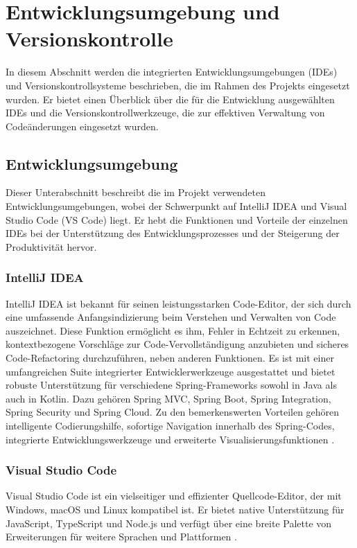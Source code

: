 \section{Entwicklungsumgebung und Versionskontrolle}
In diesem Abschnitt werden die integrierten Entwicklungsumgebungen (IDEs) und Versionskontrollsysteme beschrieben, die im Rahmen des Projekts eingesetzt wurden. Er bietet einen Überblick über die für die Entwicklung ausgewählten IDEs und die Versionskontrollwerkzeuge, die zur effektiven Verwaltung von Codeänderungen eingesetzt wurden.
\subsection{Entwicklungsumgebung}
Dieser Unterabschnitt beschreibt die im Projekt verwendeten Entwicklungsumgebungen, wobei der Schwerpunkt auf IntelliJ IDEA und Visual Studio Code (VS Code) liegt. Er hebt die Funktionen und Vorteile der einzelnen IDEs bei der Unterstützung des Entwicklungsprozesses und der Steigerung der Produktivität hervor.

\subsubsection{IntelliJ IDEA}

IntelliJ IDEA ist bekannt für seinen leistungsstarken Code-Editor, der sich durch eine umfassende Anfangsindizierung beim Verstehen und Verwalten von Code auszeichnet. Diese Funktion ermöglicht es ihm, Fehler in Echtzeit zu erkennen, kontextbezogene Vorschläge zur Code-Vervollständigung anzubieten und sicheres Code-Refactoring durchzuführen, neben anderen Funktionen. Es ist mit einer umfangreichen Suite integrierter Entwicklerwerkzeuge ausgestattet und bietet robuste Unterstützung für verschiedene Spring-Frameworks sowohl in Java als auch in Kotlin. Dazu gehören Spring MVC, Spring Boot, Spring Integration, Spring Security und Spring Cloud. Zu den bemerkenswerten Vorteilen gehören intelligente Codierungshilfe, sofortige Navigation innerhalb des Spring-Codes, integrierte Entwicklungswerkzeuge und erweiterte Visualisierungsfunktionen \cite{Jetbrains:o.J}.


\subsubsection{Visual Studio Code}

 Visual Studio Code ist ein vielseitiger und effizienter Quellcode-Editor, der mit Windows, macOS und Linux kompatibel ist. Er bietet native Unterstützung für JavaScript, TypeScript und Node.js und verfügt über eine breite Palette von Erweiterungen für weitere Sprachen und Plattformen \cite{visual-studio:o.J}.

